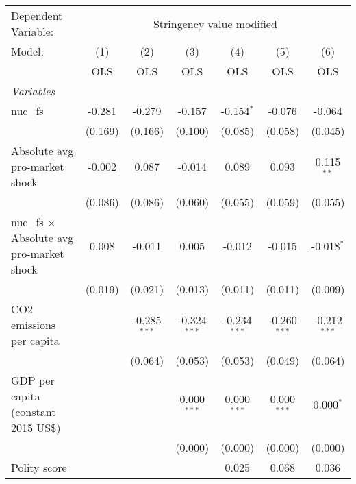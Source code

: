 
\begingroup
\centering
\begin{tabular}{lcccccc}
   \toprule
   Dependent Variable: & \multicolumn{6}{c}{Stringency value modified}\\
   Model:                                           & (1)     & (2)            & (3)            & (4)            & (5)            & (6)\\  
                                                    &  OLS    & OLS            & OLS            & OLS            & OLS            & OLS\\  
   \midrule
   \emph{Variables}\\
   nuc\_fs                                          & -0.281  & -0.279         & -0.157         & -0.154$^{*}$   & -0.076         & -0.064\\   
                                                    & (0.169) & (0.166)        & (0.100)        & (0.085)        & (0.058)        & (0.045)\\   
   Absolute avg pro-market shock                    & -0.002  & 0.087          & -0.014         & 0.089          & 0.093          & 0.115$^{**}$\\   
                                                    & (0.086) & (0.086)        & (0.060)        & (0.055)        & (0.059)        & (0.055)\\   
   nuc\_fs $\times$ Absolute avg pro-market shock   & 0.008   & -0.011         & 0.005          & -0.012         & -0.015         & -0.018$^{*}$\\   
                                                    & (0.019) & (0.021)        & (0.013)        & (0.011)        & (0.011)        & (0.009)\\   
   CO2 emissions per capita                         &         & -0.285$^{***}$ & -0.324$^{***}$ & -0.234$^{***}$ & -0.260$^{***}$ & -0.212$^{***}$\\   
                                                    &         & (0.064)        & (0.053)        & (0.053)        & (0.049)        & (0.064)\\   
   GDP per capita (constant 2015 US\$)              &         &                & 0.000$^{***}$  & 0.000$^{***}$  & 0.000$^{***}$  & 0.000$^{*}$\\   
                                                    &         &                & (0.000)        & (0.000)        & (0.000)        & (0.000)\\   
   Polity score                                     &         &                &                & 0.025          & 0.068          & 0.036\\   

\end{tabular}
